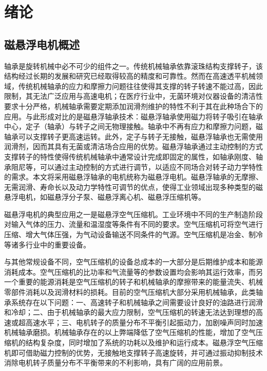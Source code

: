 \documentclass[
  lang=cn,
  degree=master,
  openany,oneside
]{nuaathesis}
\begin{document}
\makecover
\makedeclare
\frontmatter
\makeabstract
\nuaatableofcontents
\nuaalistoffigurestables


\mainmatter

\chapter{绪论}
\section{磁悬浮电机概述}
轴承是旋转机械中必不可少的组件之一。传统机械轴承依靠滚珠结构支撑转子，该结构经过长期的发展和研究已经取得较高的精度和可靠性。然而在高速透平机械领域，传统机械轴承的应力和摩擦力问题往往使得其支撑的转子转速不能过高，因此限制，其无法广泛应用与高速电机；在医疗行业中，无菌环境对仪器设备的清洁性要求十分严格，机械轴承需要定期添加润滑剂维护的特性不利于其在此种场合下的应用。与此形成对比的是磁悬浮轴承技术：磁悬浮轴承使用磁力将转子吸引在轴承中心，定子（轴承）与转子之间无物理接触。轴承中不再有应力和摩擦力问题，磁轴承可以支撑转子更高速运转。此外，定子与转子无接触，磁悬浮轴承也无需使用润滑剂，因而其具有无菌或清洁场合应用的优势。磁悬浮轴承通过主动控制的方式支撑转子的特性使得传统机械轴承中通常设计完成即固定的属性，如轴承刚度、轴承阻尼等，可以通过主动控制的方式进行调节，以适应不同场合对转子动力学特性的需求。本文将采用磁悬浮轴承的电机统称为磁悬浮电机。磁悬浮轴承的无摩擦、无需润滑、寿命长以及动力学特性可调节的优点，使得工业领域出现多种类型的磁悬浮电机，如磁悬浮分子泵、磁悬浮离心机、磁悬浮压缩机等。

磁悬浮电机的典型应用之一是磁悬浮空气压缩机。工业环境中不同的生产制造阶段对输入气体的压力、流量和温湿度等条件有不同的要求。空气压缩机可将空气进行压缩、增大气体压强，为气动设备输送不同条件的气源。空气压缩机是冶金、制冷等诸多行业中的重要设备。

与其他常规设备不同，空气压缩机的设备总成本的一大部分是后期维护成本和能源消耗成本。空气压缩机的比功率和气流量等的参数设置均会影响其运行效率，而另一个重要的能源消耗是空气压缩机的转子和机械轴承的摩擦带来的能量流失、机械零部件消耗以及润滑材料的损耗。目前的空气压缩机大部分采用机械轴承，此类轴承系统存在以下问题：一、高速转子和机械轴承之间需要设计良好的油路进行润滑和冷却；二、由于机械轴承的最大应力限制，空气压缩机的转速无法达到理想的高速或超高速水平；三、电机转子的质量分布不平衡引起振动力，加剧噪声同时加速机械轴承磨损。机械轴承存在的以上弊端降低了空气压缩机的性能，增加了空气压缩机的结构复杂度，同时增加了系统的功耗以及维护和运行成本。磁悬浮空气压缩机即可借助磁力控制的优势，无接触地支撑转子高速旋转，并可通过振动抑制技术消除电机转子质量分布不平衡带来的不利影响，具有广阔的应用前景。
\end{document}
